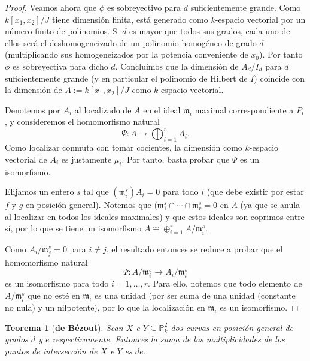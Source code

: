 \documentclass[a4paper,10pt]{book}
\newtheorem{thm}{Teorema}[chapter]
\newcommand{\PP}{\mathbb P}
\begin{document}
\begin{proof}
Veamos ahora que $\phi$ es sobreyectivo para $d$ suficientemente grande. Como $k[x_1,x_2]/J$ tiene dimensión finita, está generado como $k$-espacio vectorial por un número finito de polinomios. Si $d$ es mayor que todos sus grados, cada uno de ellos será el deshomogeneizado de un polinomio homogéneo de grado $d$ (multiplicando sus homogeneizados por la potencia conveniente de $x_0$). Por tanto $\phi$ es sobreyectiva para dicho $d$. Concluimos que la dimensión de $A_d/I_d$ para $d$ suficientemente grande (y en particular el polinomio de Hilbert de $I$) coincide con la dimensión de $A:=k[x_1,x_2]/J$ como $k$-espacio vectorial.

Denotemos por $A_i$ al localizado de $A$ en el ideal ${\mathfrak m}_i$ maximal correspondiente a $P_i$, y consideremos el homomorfismo natural
$$
\Psi:A\to\bigoplus_{i=1}^{r} A_i.
$$
Como localizar conmuta con tomar cocientes, la dimensión como $k$-espacio vectorial de $A_i$ es justamente $\mu_i$. Por tanto, basta probar que $\Psi$ es un isomorfismo.

Elijamos un entero $s$ tal que $({\mathfrak m}_i^s)A_i=0$ para todo $i$ (que debe existir por estar $f$ y $g$ en posición general). Notemos que $({\mathfrak m}_1^s\cap\cdots\cap{\mathfrak m}_r^s=0$ en $A$ (ya que se anula al localizar en todos los ideales maximales) y que estos ideales son coprimos entre sí, por lo que se tiene un isomorfismo $A\cong\oplus_{i=1}^r A/{\mathfrak m}_i^s$.

Como $A_i/{\mathfrak m}_j^s=0$ para $i\neq j$, el resultado entonces se reduce a probar que el homomorfismo natural
$$
\Psi:A/{\mathfrak m}_i^s\to A_i/{\mathfrak m}_i^s
$$
es un isomorfismo para todo $i=1,\ldots,r$. Para ello, notemos que todo elemento de $A/{\mathfrak m}_i^s$ que no esté en ${\mathfrak m}_i$ es una unidad (por ser suma de una unidad (constante no nula) y un nilpotente), por lo que la localización en ${\mathfrak m}_i$ es un isomorfismo.
\end{proof}
\begin{thm}[\bf de Bézout]
Sean $X$ e $Y\subseteq\PP^2_k$ dos curvas en posición general de grados $d$ y $e$ respectivamente. Entonces la suma de las multiplicidades de los puntos de intersección de $X$ e $Y$ es $de$.
\end{thm}
\end{document}
